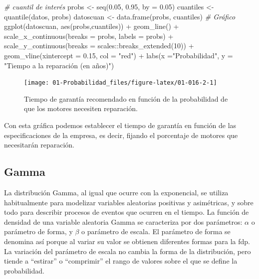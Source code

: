 \documentclass[
]{book}
\newenvironment{Shaded}{\begin{snugshade}}{\end{snugshade}}
\newcommand{\AttributeTok}[1]{\textcolor[rgb]{0.77,0.63,0.00}{#1}}
\newcommand{\CommentTok}[1]{\textcolor[rgb]{0.56,0.35,0.01}{\textit{#1}}}
\newcommand{\DecValTok}[1]{\textcolor[rgb]{0.00,0.00,0.81}{#1}}
\newcommand{\FloatTok}[1]{\textcolor[rgb]{0.00,0.00,0.81}{#1}}
\newcommand{\FunctionTok}[1]{\textcolor[rgb]{0.00,0.00,0.00}{#1}}
\newcommand{\NormalTok}[1]{#1}
\newcommand{\OtherTok}[1]{\textcolor[rgb]{0.56,0.35,0.01}{#1}}
\newcommand{\SpecialCharTok}[1]{\textcolor[rgb]{0.00,0.00,0.00}{#1}}
\newcommand{\StringTok}[1]{\textcolor[rgb]{0.31,0.60,0.02}{#1}}
\theoremstyle{definition}
\theoremstyle{definition}
\theoremstyle{definition}
\theoremstyle{definition}
\theoremstyle{remark}
\begin{document}
\begin{Shaded}
\begin{Highlighting}[]
\CommentTok{\# cuantil de interés}
\NormalTok{probs }\OtherTok{\textless{}{-}} \FunctionTok{seq}\NormalTok{(}\FloatTok{0.05}\NormalTok{, }\FloatTok{0.95}\NormalTok{, }\AttributeTok{by =} \FloatTok{0.05}\NormalTok{)}
\NormalTok{cuantiles }\OtherTok{\textless{}{-}} \FunctionTok{quantile}\NormalTok{(datos, probs)}
\NormalTok{datoscuan }\OtherTok{\textless{}{-}} \FunctionTok{data.frame}\NormalTok{(probs, cuantiles)}
\CommentTok{\# Gráfico}
\FunctionTok{ggplot}\NormalTok{(datoscuan, }\FunctionTok{aes}\NormalTok{(probs,cuantiles)) }\SpecialCharTok{+} 
  \FunctionTok{geom\_line}\NormalTok{() }\SpecialCharTok{+}
  \FunctionTok{scale\_x\_continuous}\NormalTok{(}\AttributeTok{breaks =}\NormalTok{ probs, }\AttributeTok{labels =}\NormalTok{ probs) }\SpecialCharTok{+}
  \FunctionTok{scale\_y\_continuous}\NormalTok{(}\AttributeTok{breaks =}\NormalTok{ scales}\SpecialCharTok{::}\FunctionTok{breaks\_extended}\NormalTok{(}\DecValTok{10}\NormalTok{)) }\SpecialCharTok{+}
  \FunctionTok{geom\_vline}\NormalTok{(}\AttributeTok{xintercept =} \FloatTok{0.15}\NormalTok{, }\AttributeTok{col =} \StringTok{"red"}\NormalTok{) }\SpecialCharTok{+}
  \FunctionTok{labs}\NormalTok{(}\AttributeTok{x =}\StringTok{"Probabilidad"}\NormalTok{, }\AttributeTok{y =} \StringTok{"Tiempo a la reparación (en años)"}\NormalTok{)  }
\end{Highlighting}
\end{Shaded}

\begin{figure}

{\centering \texttt{[image: 01-Probabilidad\_files/figure-latex/01-016-2-1]} 

}

\caption{Tiempo de garantía recomendado en función de la probabilidad de que los motores necesiten reparación.}\label{fig:01-016-2}
\end{figure}

Con esta gráfica podemos establecer el tiempo de garantía en función de las especificaciones de la empresa, es decir, fijando el porcentaje de motores que necesitarán reparación.

\hypertarget{gamma}{%
\subsection{Gamma}\label{gamma}}

La distribución Gamma, al igual que ocurre con la exponencial, se utiliza habitualmente para modelizar variables aleatorias positivas y asimétricas, y sobre todo para describir procesos de eventos que ocurren en el tiempo. La función de densidad de una variable aleatoria Gamma se caracteriza por dos parámetros: \(\alpha\) o parámetro de forma, y \(\beta\) o parámetro de escala. El parámetro de forma se denomina así porque al variar su valor se obtienen diferentes formas para la fdp. La variación del parámetro de escala no cambia la forma de la distribución, pero tiende a ``estirar'' o ``comprimir'' el rango de valores sobre el que se define la probabilidad.
\end{document}
